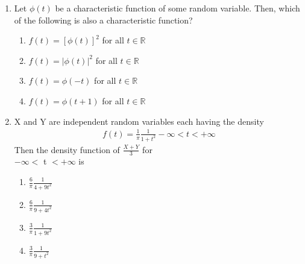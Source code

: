 \renewcommand{\theequation}{\theenumi}
\renewcommand{\thefigure}{\theenumi}
\renewcommand{\thetable}{\theenumi}
\begin{enumerate}[label=\thesection.\arabic*.,ref=\thesection.\theenumi]

\item Let $\phi(t)$ be a characteristic function of some random variable.  Then, which of the following is also a characteristic function?
\begin{enumerate}
    \item $f(t) = [\phi(t)]^2$ for all $t \in \mathbb{R}$
    \item $f(t) = |\phi(t)|^2$ for all $t \in \mathbb{R}$
    \item $f(t) = \phi(-t)$ for all $t \in \mathbb{R}$
    \item $f(t) = \phi(t+1)$ for all $t \in \mathbb{R}$
\end{enumerate}
%
\solution

%
\item X and Y are independent random variables each having the density
\begin{align}
    f(t) = \displaystyle\frac{1}{\pi} \frac{1}{1+{t}^2} -\infty < t < +\infty
\end{align}
Then the density function of $\displaystyle\frac{X+Y}{3}$ for \\$-\infty <$ t $< +\infty$ is\bigskip
    \begin{enumerate}\itemsep0.5cm
        \item $\displaystyle\frac{6}{\pi} \frac{1}{4+9{t}^2}$
        \item $\displaystyle\frac{6}{\pi} \frac{1}{9+4{t}^2}$
        \item $\displaystyle\frac{3}{\pi} \frac{1}{1+9{t}^2}$
        \item $\displaystyle\frac{3}{\pi} \frac{1}{9+{t}^2}$
    \end{enumerate}

%
\solution



\end{enumerate}
